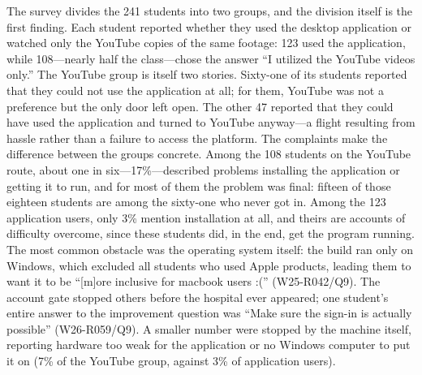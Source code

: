 The survey divides the 241 students into two groups, and the division itself
is the first finding. Each student reported whether they used the desktop
application or watched only the YouTube copies of the same footage: 123 used
the application, while 108---nearly half the class---chose the answer ``I
utilized the YouTube videos only.'' The YouTube group is itself two stories.
Sixty-one of its students reported that they could not use the application
at all; for them, YouTube was not a preference but the only door left open.
The other 47 reported that they could have used the application and turned
to YouTube anyway---a flight resulting from hassle rather than a failure to
access the platform.
The complaints make the difference between the groups concrete. Among the
108 students on the YouTube route, about one in six---17\%---described
problems installing the application or getting it to run, and for most of
them the problem was final: fifteen of those eighteen students are among the
sixty-one who never got in. Among the 123 application users, only 3\%
mention installation at all, and theirs are accounts of difficulty overcome,
since these students did, in the end, get the program running. The most
common obstacle was the operating system itself: the build ran only on
Windows, which excluded all students who used Apple products, leading them
to want it to be ``[m]ore inclusive for macbook users :('' (W25-R042/Q9).
The account gate stopped others before the hospital ever appeared; one
student's entire answer to the improvement question was ``Make sure the
sign-in is actually possible'' (W26-R059/Q9). A smaller number were stopped
by the machine itself, reporting hardware too weak for the application or no
Windows computer to put it on (7\% of the YouTube group, against 3\% of
application users).

